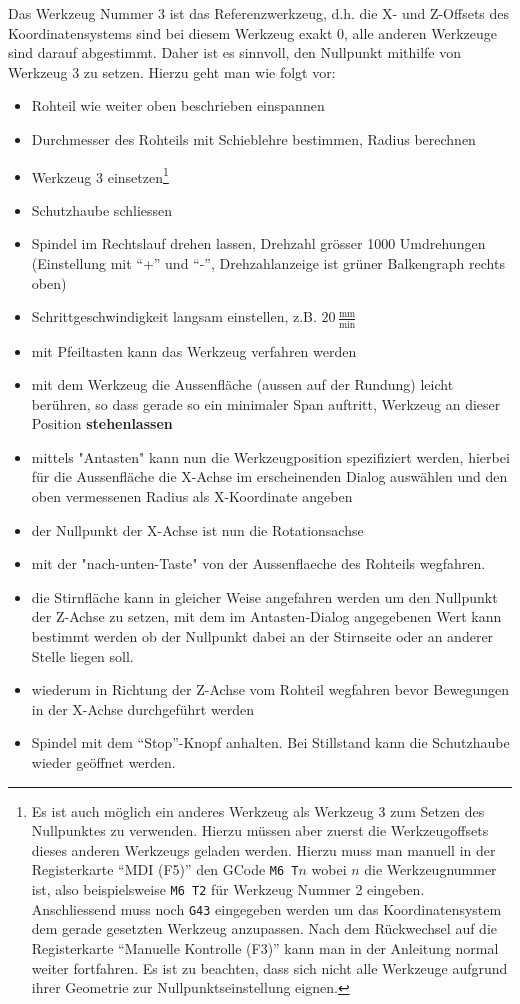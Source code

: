 \documentclass{\basedir/fablab-document}
\begin{document}
Das Werkzeug Nummer 3 ist das Referenzwerkzeug, d.h. die X- und Z-Offsets des Koordinatensystems sind bei diesem Werkzeug exakt $0$, alle anderen Werkzeuge sind darauf abgestimmt. Daher ist es sinnvoll, den Nullpunkt mithilfe von Werkzeug 3 zu setzen. Hierzu geht man wie folgt vor:
\begin{itemize}
	\item Rohteil wie weiter oben beschrieben einspannen
	\item Durchmesser des Rohteils mit Schieblehre bestimmen, Radius berechnen
	\item Werkzeug 3 einsetzen\footnote{Es ist auch möglich ein anderes Werkzeug als Werkzeug 3 zum Setzen des Nullpunktes zu verwenden. Hierzu müssen aber zuerst die Werkzeugoffsets dieses anderen Werkzeugs geladen werden. Hierzu muss man manuell in der Registerkarte \enquote{MDI (F5)} den GCode \texttt{M6 T$n$} wobei $n$ die Werkzeugnummer ist, also beispielsweise \texttt{M6 T2} für Werkzeug Nummer 2 eingeben. Anschliessend muss noch \texttt{G43} eingegeben werden um das Koordinatensystem dem gerade gesetzten Werkzeug anzupassen. Nach dem Rückwechsel auf die Registerkarte \enquote{Manuelle Kontrolle (F3)} kann man in der Anleitung normal weiter fortfahren. Es ist zu beachten, dass sich nicht alle Werkzeuge aufgrund ihrer Geometrie zur Nullpunktseinstellung eignen.}
	\item Schutzhaube schliessen
	\item Spindel im Rechtslauf drehen lassen, Drehzahl grösser 1000 Umdrehungen (Einstellung mit \enquote{+} und \enquote{-}, Drehzahlanzeige ist grüner Balkengraph rechts oben)
	\item Schrittgeschwindigkeit langsam einstellen, z.B. $20\,\frac{\mathrm{mm}}{\mathrm{min}}$
	\item mit Pfeiltasten kann das Werkzeug verfahren werden
	\item mit dem Werkzeug die Aussenfläche (aussen auf der Rundung) leicht berühren, so dass gerade so ein minimaler Span auftritt, Werkzeug an dieser Position \textbf{stehenlassen}
	\item mittels "Antasten" kann nun die Werkzeugposition spezifiziert werden, hierbei für die Aussenfläche die X-Achse im erscheinenden Dialog auswählen und den oben vermessenen Radius als X-Koordinate angeben
	\item der Nullpunkt der X-Achse ist nun die Rotationsachse
	\item mit der "nach-unten-Taste" von der Aussenflaeche des Rohteils wegfahren.
	\item die Stirnfläche kann in gleicher Weise angefahren werden um den Nullpunkt der Z-Achse zu setzen, mit dem im Antasten-Dialog angegebenen Wert kann bestimmt werden ob der Nullpunkt dabei an der Stirnseite oder an anderer Stelle liegen soll.
	\item wiederum in Richtung der Z-Achse vom Rohteil wegfahren bevor Bewegungen in der X-Achse durchgeführt werden
	\item Spindel mit dem \enquote{Stop}-Knopf anhalten. Bei Stillstand kann die Schutzhaube wieder geöffnet werden.
\end{itemize}
\end{document}
